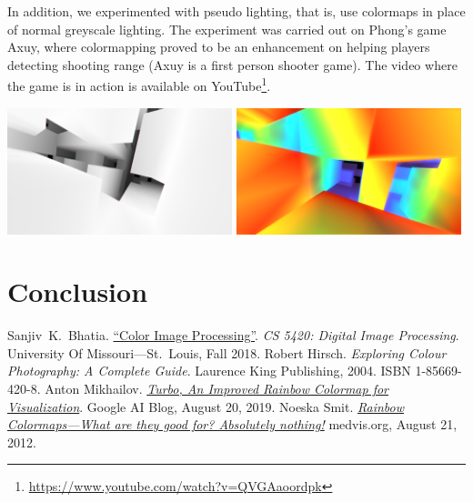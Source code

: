 \documentclass[a4paper,12pt]{article}
\begin{document}
In addition, we experimented with pseudo lighting, that is, use colormaps
in place of normal greyscale lighting.  The experiment was carried out on
Phong's game Axuy, where colormapping proved to be an enhancement on helping
players detecting shooting range (Axuy is a first person shooter game).
The video where the game is in action is available on
YouTube\footnote{\url{https://www.youtube.com/watch?v=QVGAaoordpk}}.
\begin{center}
  \includegraphics[width=0.49\textwidth]{axuy-grey.png}
  \includegraphics[width=0.49\textwidth]{axuy-turbo.png}
\end{center}

\section{Conclusion}

\begin{thebibliography}{69}
   Sanjiv~K.~Bhatia.
    \href{http://www.cs.umsl.edu/~sanjiv/classes/cs5420/lectures/color.pdf}
         {``Color Image Processing''}.
    \emph{CS 5420: Digital Image Processing}.
    University Of Missouri---St.~Louis, Fall 2018.
   Robert Hirsch.
    \emph{Exploring Colour Photography: A Complete Guide}.
    Laurence King Publishing, 2004. ISBN 1-85669-420-8.
   Anton Mikhailov.
    \href{https://ai.googleblog.com/2019/08/turbo-improved-rainbow-colormap-for.html}
         {\emph{Turbo, An Improved Rainbow Colormap for Visualization}}.
    Google AI Blog, August 20, 2019.
   Noeska Smit.
    \href{https://medvis.org/2012/08/21/rainbow-colormaps-what-are-they-good-for-absolutely-nothing/}
         {\emph{Rainbow Colormaps---What are they good for? Absolutely nothing!}}
    medvis.org, August 21, 2012.
\end{thebibliography}
\end{document}
